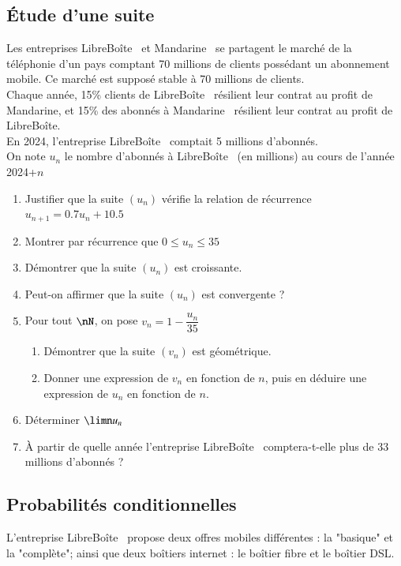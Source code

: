 \documentclass[oneside,12pt]{article}
\begin{document}
\subsection{Étude d'une suite}
Les entreprises LibreBoîte\texttrademark~ et Mandarine\texttrademark~ se partagent le marché de la téléphonie d'un pays comptant 70 millions de clients possédant un abonnement mobile. Ce marché est supposé stable à 70 millions de clients.\\[5pt]
Chaque année, 15\% clients de LibreBoîte\texttrademark~ résilient leur contrat au profit de Mandarine\texttrademark, et 15\% des abonnés à Mandarine\texttrademark~ résilient leur contrat au profit de LibreBoîte\texttrademark.\\[5pt]
En 2024, l'entreprise LibreBoîte\texttrademark~ comptait 5 millions d'abonnés.\\[5pt]
On note $u_n$ le nombre d'abonnés à LibreBoîte\texttrademark~ (en millions) au cours de l'année 2024+$n$
\begin{enumerate}
    \item Justifier que la suite $(u_n)$ vérifie la relation de récurrence $u_{n+1}=0.7u_n+10.5$
    \item Montrer par récurrence que $0\leq u_n \leq 35$
    \item Démontrer que la suite $(u_n)$ est croissante.
    \item Peut-on affirmer que la suite $(u_n)$ est convergente ?
    \item Pour tout $\nN$, on pose $v_n=1-\dfrac{u_n}{35}$
    \begin{enumerate}
        \item Démontrer que la suite $(v_n)$ est géométrique.
        \item Donner une expression de $v_n$ en fonction de $n$, puis en déduire une expression de $u_n$ en fonction de $n$.
    \end{enumerate}
    \item Déterminer $\limn u_n$
    \item À partir de quelle année l'entreprise LibreBoîte\texttrademark~ comptera-t-elle plus de 33 millions d'abonnés ?
\end{enumerate}


\subsection{Probabilités conditionnelles}
L'entreprise LibreBoîte\texttrademark~ propose deux offres mobiles différentes : la "basique" et la "complète"; ainsi que deux boîtiers internet : le boîtier fibre et le boîtier DSL.
\end{document}
